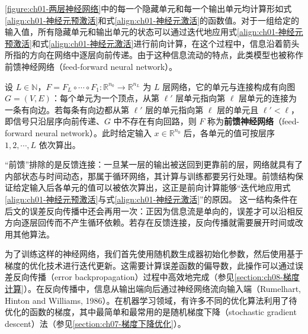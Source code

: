 \documentclass[../../main.tex]{subfiles}
\begin{document}
\cref{figure:ch01-两层神经网络}中的每一个隐藏单元和每一个输出单元均计算形如式\eqref{align:ch01-神经元预激活}和式\eqref{align:ch01-神经元激活}的函数值。对于一组给定的输入值，所有隐藏单元和输出单元的状态可以通过迭代地应用式\eqref{align:ch01-神经元预激活}和式\eqref{align:ch01-神经元激活}进行前向计算，在这个过程中，信息沿着箭头所指的方向在网络中逐层向前传递。由于这种信息流动的特点，此类模型也被称作前馈神经网络（feed-forward neural network）。

\begin{definition}[前馈神经网络]\label{definition:ch01-前馈神经网络}
设 $L\in\mathbb{N}$，$F=F_{L}\circ\cdots\circ F_{1}:\mathbb{R}^{n_{0}}\to\mathbb{R}^{n_{L}}$ 为 $L$ 层网络，它的单元与连接构成有向图 $G=(V,E)$：每个单元为一个顶点，从第 $\ell'$ 层单元指向第 $\ell$ 层单元的连接为一条有向边。若每条有向边都从第 $\ell'$ 层的单元指向第 $\ell$ 层的单元且 $\ell'<\ell$，即信号只沿层序向前传递、$G$ 中不存在有向回路，则 $F$ 称为\textbf{前馈神经网络}（feed-forward neural network）。此时给定输入 $x\in\mathbb{R}^{n_{0}}$ 后，各单元的值可按层序 $1,2,\cdots,L$ 依次算出。
\end{definition}

\begin{remark}
“前馈”排除的是反馈连接：一旦某一层的输出被送回到更靠前的层，网络就具有了内部状态与时间动态，那属于循环网络，其计算与训练都要另行处理。前馈结构保证给定输入后各单元的值可以被依次算出，这正是前向计算能够“迭代地应用式\eqref{align:ch01-神经元预激活}与式\eqref{align:ch01-神经元激活}”的原因。
这一结构条件在后文的误差反向传播中还会再用一次：正因为信息流是单向的，误差才可以沿相反方向逐层回传而不产生循环依赖。若存在反馈连接，反向传播就需要展开时间或改用其他算法。
\end{remark}

为了训练这样的神经网络，我们首先使用随机数生成器初始化参数，然后使用基于梯度的优化技术进行迭代更新。这需要计算误差函数的偏导数，此操作可以通过误差反向传播（error backpropagation）过程中高效地完成（参见\cref{section:ch08-梯度计算}）。在反向传播中，信息从输出端向后通过神经网络流向输入端（Rumelhart, Hinton and Williams, 1986）。在机器学习领域，有许多不同的优化算法利用了待优化的函数的梯度，其中最简单和最常用的是随机梯度下降（stochastic gradient descent）法（参见\cref{section:ch07-梯度下降优化}）。
\end{document}
